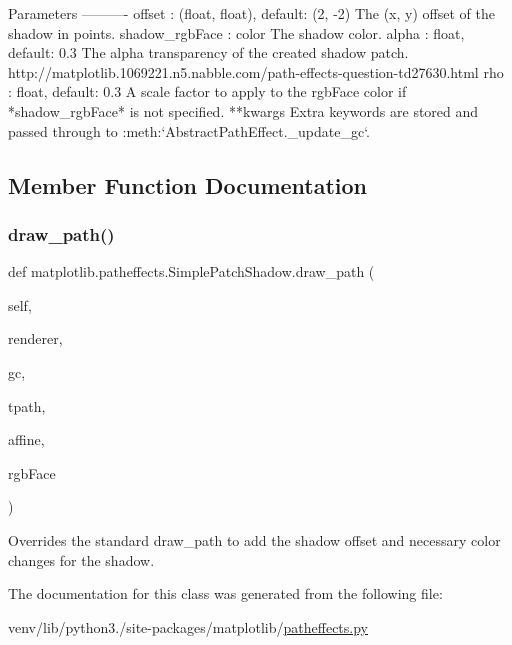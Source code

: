\begin{DoxyVerb}Parameters
----------
offset : (float, float), default: (2, -2)
    The (x, y) offset of the shadow in points.
shadow_rgbFace : color
    The shadow color.
alpha : float, default: 0.3
    The alpha transparency of the created shadow patch.
    http://matplotlib.1069221.n5.nabble.com/path-effects-question-td27630.html
rho : float, default: 0.3
    A scale factor to apply to the rgbFace color if *shadow_rgbFace*
    is not specified.
**kwargs
    Extra keywords are stored and passed through to
    :meth:`AbstractPathEffect._update_gc`.\end{DoxyVerb}
 

\subsection{Member Function Documentation}
\mbox{\label{classmatplotlib_1_1patheffects_1_1SimplePatchShadow_a2348709dab173deb5a2ac085acf86161}} 
\subsubsection{\texorpdfstring{draw\+\_\+path()}{draw\_path()}}
{\footnotesize\ttfamily def matplotlib.\+patheffects.\+Simple\+Patch\+Shadow.\+draw\+\_\+path (\begin{DoxyParamCaption}\item[{}]{self,  }\item[{}]{renderer,  }\item[{}]{gc,  }\item[{}]{tpath,  }\item[{}]{affine,  }\item[{}]{rgb\+Face }\end{DoxyParamCaption})}

\begin{DoxyVerb}Overrides the standard draw_path to add the shadow offset and
necessary color changes for the shadow.
\end{DoxyVerb}
 

The documentation for this class was generated from the following file\+:\begin{DoxyCompactItemize}
\item 
venv/lib/python3./site-\/packages/matplotlib/\hyperlink{patheffects_8py}{patheffects.\+py}\end{DoxyCompactItemize}
